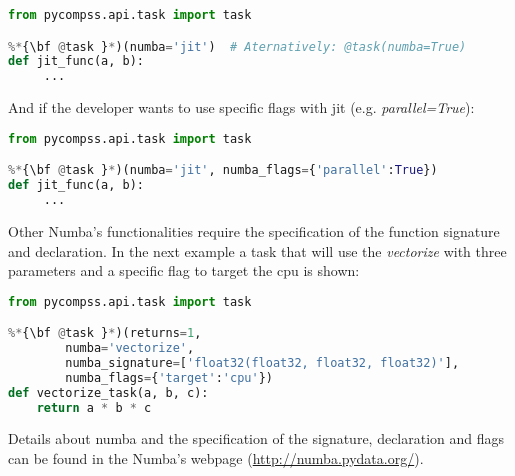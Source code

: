 \begin{lstlisting}[language=python]
from pycompss.api.task import task

%*{\bf @task }*)(numba='jit')  # Aternatively: @task(numba=True)
def jit_func(a, b):
     ...
\end{lstlisting}

And if the developer wants to use specific flags with jit (e.g. {\it parallel=True}):

\begin{lstlisting}[language=python]
from pycompss.api.task import task

%*{\bf @task }*)(numba='jit', numba_flags={'parallel':True})
def jit_func(a, b):
     ...
\end{lstlisting}

Other Numba's functionalities require the specification of the function signature and declaration.
In the next example a task that will use the {\it vectorize} with three parameters and a specific flag to target the cpu is shown:

\begin{lstlisting}[language=python]
from pycompss.api.task import task

%*{\bf @task }*)(returns=1, 
        numba='vectorize',
        numba_signature=['float32(float32, float32, float32)'],
        numba_flags={'target':'cpu'})
def vectorize_task(a, b, c):
    return a * b * c 
\end{lstlisting}

Details about numba and the specification of the signature, declaration and flags can be found in the Numba's webpage (\url{http://numba.pydata.org/}).

